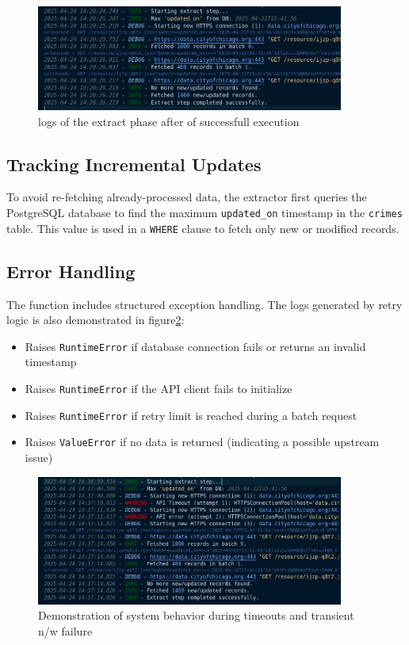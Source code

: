 \documentclass[12pt]{article}
\begin{document}
\begin{figure}[H]
    \centering
    \includegraphics[width=0.9\textwidth]{figures/extract_logs.png}
    \caption{logs of the extract phase after of successfull execution}
    \label{fig:extract_logs}
\end{figure}


\subsection*{Tracking Incremental Updates}
To avoid re-fetching already-processed data, the extractor first queries the PostgreSQL database to find the maximum \texttt{updated\_on} timestamp in the \texttt{crimes} table. This value is used in a \texttt{WHERE} clause to fetch only new or modified records.

\subsection*{Error Handling}
The function includes structured exception handling. The logs generated by retry logic is also demonstrated in figure\ref{fig:extract_logs_exception}:
\begin{itemize}
    \item Raises \texttt{RuntimeError} if database connection fails or returns an invalid timestamp
    \item Raises \texttt{RuntimeError} if the API client fails to initialize
    \item Raises \texttt{RuntimeError} if retry limit is reached during a batch request
    \item Raises \texttt{ValueError} if no data is returned (indicating a possible upstream issue)
\end{itemize}

\begin{figure}[h!]
    \centering
    \includegraphics[width=0.9\textwidth]{figures/extract_logs_exception.png}
    \caption{Demonstration of system behavior during timeouts and transient n/w failure}
    \label{fig:extract_logs_exception}
\end{figure}
\end{document}

